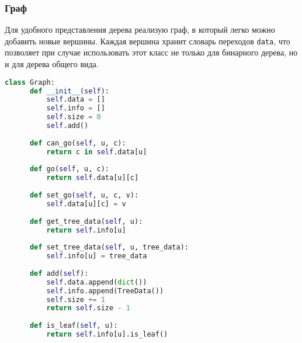 \subsubsection{Граф}
Для удобного представления дерева реализую граф, в который легко можно добавить новые вершины. Каждая вершина хранит словарь переходов \texttt{data}, что позволяет при случае использовать этот класс не только для бинарного дерева, но и для дерева общего вида.
\begin{lstlisting}[language=python, keepspaces=true]
class Graph:
      def __init__(self):
          self.data = []
          self.info = []
          self.size = 0
          self.add()
  
      def can_go(self, u, c):
          return c in self.data[u]
  
      def go(self, u, c):
          return self.data[u][c]
  
      def set_go(self, u, c, v):
          self.data[u][c] = v
  
      def get_tree_data(self, u):
          return self.info[u]
  
      def set_tree_data(self, u, tree_data):
          self.info[u] = tree_data
  
      def add(self):
          self.data.append(dict())
          self.info.append(TreeData())
          self.size += 1
          return self.size - 1
  
      def is_leaf(self, u):
          return self.info[u].is_leaf()
\end{lstlisting}
\pagebreak
